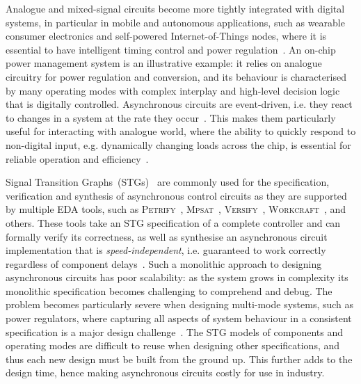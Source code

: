 \documentclass[british, journal]{IEEEtran}
\newcommand{\noun}[1]{\textsc{#1}}
\begin{document}
Analogue and mixed-signal circuits become more tightly integrated with
digital systems, in particular in mobile and autonomous applications,
such as wearable consumer electronics and self-powered Internet-of-Things
nodes, where it is essential to have intelligent timing control and power
regulation~\cite{7287733}\cite{talbot2016holistic}\cite{6241632}.
An on-chip power management system is an illustrative example: it relies
on analogue circuitry for power regulation and conversion, and its behaviour
is characterised by many operating modes with complex interplay and
high-level decision logic that is digitally controlled.
Asynchronous circuits are event-driven, i.e. they react to changes
in a system at the rate they occur~\cite{sparso2001principles}.
This makes them particularly useful for interacting with analogue world,
where the ability to quickly respond to non-digital input, e.g.
dynamically changing loads across the chip, is essential for reliable
operation and efficiency~\cite{2008_audy_isscc_tutorial}.

Signal Transition Graphs~(STGs)~\cite{Chu_1987_phd}\cite{Rosenblum_1985_tpn}
are commonly used for the specification,
verification and synthesis of asynchronous control circuits as they are
supported by multiple EDA tools, such as \noun{Petrify}~\cite{Cortadella},
\noun{Mpsat}~\cite{khomenko2004detecting}, \noun{Versify}~\cite{i1997formal},
\noun{Workcraft}~\cite{2007_poliakov_workcraft}\cite{Workcraft_website}, and
others.
These tools take an STG specification of a complete controller and can
formally verify its correctness, as well as synthesise an asynchronous
circuit implementation that is \emph{speed-independent}, i.e. guaranteed
to work correctly regardless of component delays~\cite{Muller_1959_ts}.
Such a monolithic approach to designing asynchronous circuits has
poor scalability: as the system grows in complexity its monolithic
specification becomes challenging to comprehend and debug. The problem
becomes particularly severe when designing multi-mode systems, such as
power regulators, where capturing all aspects of system behaviour in a
consistent specification is a major design
challenge~\cite{2014_sokolov_ftfc}\cite{sokolov2015design}.
The STG models of components and operating modes are difficult to reuse
when designing other specifications, and thus each new design must be built
from the ground up. This further adds to the design time, hence making
asynchronous circuits costly for use in industry.
\end{document}
